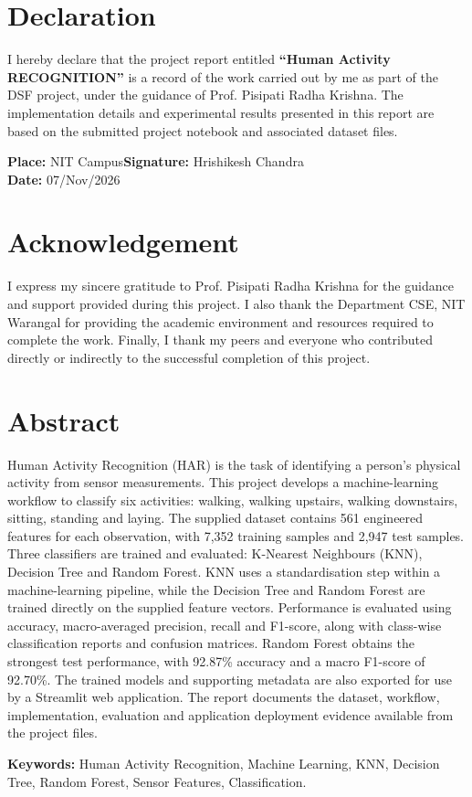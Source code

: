 \chapter*{Declaration}
I hereby declare that the project report entitled \textbf{``Human Activity RECOGNITION''} 
is a record of the work carried out by me 
as part of the DSF project, 
under the guidance of Prof. Pisipati Radha Krishna. The implementation details and experimental results presented in this report are based on the submitted project notebook and associated dataset files.

\vspace{1.5cm}
\textbf{Place:} NIT Campus\hfill \textbf{Signature:} Hrishikesh Chandra\\
\textbf{Date:} 07/Nov/2026

\chapter*{Acknowledgement}
I express my sincere 
gratitude to Prof. Pisipati Radha Krishna for the 
guidance and support 
provided during this project. 
I also thank the Department CSE, NIT Warangal 
for providing the academic environment 
and resources required to complete the work. 
Finally, I thank my peers and everyone who 
contributed directly or indirectly to the 
successful completion of this project.

\chapter*{Abstract}
Human Activity Recognition (HAR) is the task of identifying a person's physical activity from sensor measurements. This project develops a machine-learning workflow to classify six activities: walking, walking upstairs, walking downstairs, sitting, standing and laying. The supplied dataset contains 561 engineered features for each observation, with 7,352 training samples and 2,947 test samples. Three classifiers are trained and evaluated: K-Nearest Neighbours (KNN), Decision Tree and Random Forest. KNN uses a standardisation step within a machine-learning pipeline, while the Decision Tree and Random Forest are trained directly on the supplied feature vectors. Performance is evaluated using accuracy, macro-averaged precision, recall and F1-score, along with class-wise classification reports and confusion matrices. Random Forest obtains the strongest test performance, with 92.87\% accuracy and a macro F1-score of 92.70\%. The trained models and supporting metadata are also exported for use by a Streamlit web application. The report documents the dataset, workflow, implementation, evaluation and application deployment evidence available from the project files.

\textbf{Keywords:} Human Activity Recognition, Machine Learning, KNN, Decision Tree, Random Forest, Sensor Features, Classification.
